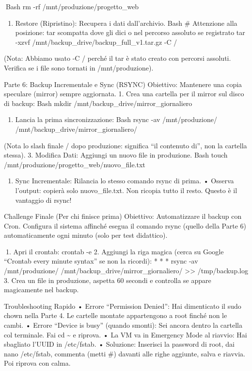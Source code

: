 \documentclass[11pt,a4paper]{article}
\providecommand{\tightlist}{%
  \setlength{\itemsep}{0pt}\setlength{\parskip}{0pt}}
\begin{document}
Bash rm -rf /mnt/produzione/progetto\_web

\begin{enumerate}
\def\labelenumi{\arabic{enumi}.}
\setcounter{enumi}{3}
\tightlist
\item
  Restore (Ripristino): Recupera i dati dall'archivio. Bash \#
  Attenzione alla posizione: tar scompatta dove gli dici o nel percorso
  assoluto se registrato tar -xzvf
  /mnt/backup\_drive/backup\_full\_v1.tar.gz -C /
\end{enumerate}

(Nota: Abbiamo usato -C / perché il tar è stato creato con percorsi
assoluti. Verifica se i file sono tornati in /mnt/produzione).

Parte 6: Backup Incrementale e Sync (RSYNC) Obiettivo: Mantenere una
copia speculare (mirror) sempre aggiornata. 1. Crea una cartella per il
mirror sul disco di backup: Bash mkdir
/mnt/backup\_drive/mirror\_giornaliero

\begin{enumerate}
\def\labelenumi{\arabic{enumi}.}
\setcounter{enumi}{1}
\tightlist
\item
  Lancia la prima sincronizzazione: Bash rsync -av /mnt/produzione/
  /mnt/backup\_drive/mirror\_giornaliero/
\end{enumerate}

(Nota lo slash finale / dopo produzione: significa ``il contenuto di'',
non la cartella stessa). 3. Modifica Dati: Aggiungi un nuovo file in
produzione. Bash touch /mnt/produzione/progetto\_web/nuovo\_file.txt

\begin{enumerate}
\def\labelenumi{\arabic{enumi}.}
\setcounter{enumi}{3}
\tightlist
\item
  Sync Incrementale: Rilancia lo stesso comando rsync di prima. •
  Osserva l'output: copierà solo nuovo\_file.txt. Non ricopia tutto il
  resto. Questo è il vantaggio di rsync!
\end{enumerate}

Challenge Finale (Per chi finisce prima) Obiettivo: Automatizzare il
backup con Cron. Configura il sistema affinché esegua il comando rsync
(quello della Parte 6) automaticamente ogni minuto (solo per test
didattico).

1. Apri il crontab: crontab -e 2. Aggiungi la riga magica (cerca su
Google ``Crontab every minute syntax'' se non la ricordi): \emph{ } * *
* rsync -av /mnt/produzione/ /mnt/backup\_drive/mirror\_giornaliero/
\textgreater\textgreater{} /tmp/backup.log 3. Crea un file in
produzione, aspetta 60 secondi e controlla se appare magicamente nel
backup.

Troubleshooting Rapido • Errore ``Permission Denied'': Hai dimenticato
il sudo chown nella Parte 4. Le cartelle montate appartengono a root
finché non le cambi. • Errore ``Device is busy'' (quando smonti): Sei
ancora dentro la cartella col terminale. Fai cd \textasciitilde{} e
riprova. • La VM va in Emergency Mode al riavvio: Hai sbagliato l'UUID
in /etc/fstab. • Soluzione: Inserisci la password di root, dai nano
/etc/fstab, commenta (metti \#) davanti alle righe aggiunte, salva e
riavvia. Poi riprova con calma.


\end{document}
